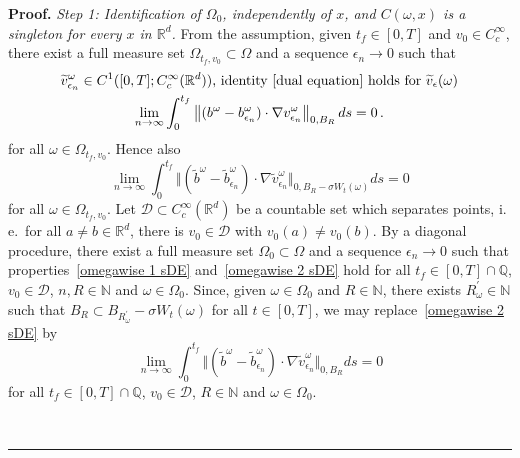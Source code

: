 \documentclass[a4paper,10pt]{article}
\newenvironment{proof}[1][Proof]{\noindent\textbf{#1.} }{\ \rule{0.5em}{0.5em}}
\newcommand{\mr}{\mathbb{R}}
\begin{document}
\begin{proof}
\emph{Step 1: Identification of $\Omega_0$, independently of $x$, and $C(\omega,x) $ is a singleton for every $x$ in $\mr^d$.}
From the assumption, given $t_{f}\in [0,T]  $ and $v_{0}\in
C_{c}^{\infty}$, there exist a full measure set $\Omega_{t_{f},v_{0}} 
\subset\Omega$ and a sequence $\epsilon_{n}\rightarrow0$ such that
\begin{gather}
\widetilde{v}_{\epsilon_{n}}^\omega  \in C^{1}([
0,T]  ;C_{c}^{\infty}(\mathbb{R}^{d}))  \text{, identity
} \eqref{dual equation} \text{ holds for~}\widetilde{v}_{\epsilon}(\omega)  
\label{omegawise 1 sDE} \\
\lim_{n\rightarrow\infty}\int_{0}^{t_{f}}\left\Vert (  b^\omega  -b_{\epsilon_{n}}^\omega  )  \cdot\nabla
v_{\epsilon_{n}}^\omega  \right\Vert _{0,B_R}ds=0 \,. \nonumber
\end{gather}
for all $\omega\in\Omega_{t_{f},v_{0}}$. Hence also
\begin{equation}
\lim_{n\rightarrow\infty}\int_{0}^{t_{f}}\big\Vert ( \widetilde{b}^\omega  -\widetilde{b}_{\epsilon_{n}}^\omega )  \cdot\nabla\widetilde{v}_{\epsilon_{n}}^\omega
\big\Vert_{0,B_{R}-\sigma W_{t} (\omega)} ds=0 \label{omegawise 2 sDE}
\end{equation}
for all $\omega\in\Omega_{t_{f},v_{0}}$. Let $\mathcal{D}\subset C_{c}^{\infty}(\mathbb{R}^{d})$ be a countable set which separates points, i.\,e.\ for all $a\neq
b\in\mathbb{R}^{d}$, there is $v_{0}\in\mathcal{D}$ with $v_{0}(a) \neq v_{0}(b)$. By a diagonal procedure, there exist
a full measure set $\Omega_{0}\subset\Omega$ and a sequence
$\epsilon_{n}\rightarrow0$ such that properties~\eqref{omegawise 1 sDE} and~\eqref{omegawise 2 sDE} hold for all $t_{f}\in [0,T]  \cap\mathbb{Q}$,
$v_{0}\in\mathcal{D}$, $n,R\in\mathbb{N}$ and $\omega\in \Omega_{0}$.
Since, given $\omega\in \Omega_{0}$ and $R\in\mathbb{N}$, there
exists $R_{\omega}^{\prime}\in\mathbb{N}$ such that $B_{R} \subset B_{R_{\omega }^{\prime}} -\sigma W_{t}(\omega)$ for all $t\in [0,T]  $, we may replace~\eqref{omegawise 2 sDE} by
\begin{equation}
\lim_{n\rightarrow\infty}\int_{0}^{t_{f}} \big\Vert (\widetilde{b}
^\omega  -\widetilde{b}_{\epsilon_{n}}^\omega ) \cdot\nabla\widetilde{v}_{\epsilon_{n}}^\omega
\big\Vert_{0,B_R}ds=0
\label{omegawise 2 bis sDE}
\end{equation}
for all $t_{f}\in [0,T]  \cap\mathbb{Q}$, $v_{0}\in\mathcal{D}$,
$R\in\mathbb{N}$ and $\omega\in \Omega_0$.


\end{proof}
\end{document}
